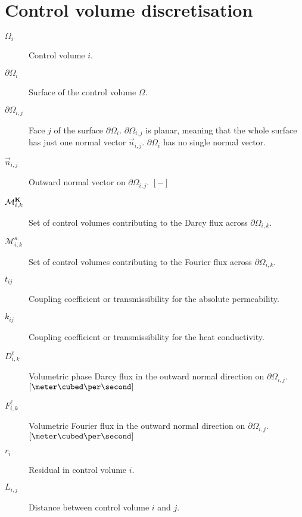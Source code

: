 
\section{Control volume discretisation}

\begin{description}
\item[$\Omega_i$] Control volume $i$.
\item[$\partial\Omega_i$] Surface of the control volume $\Omega$.
\item[$\partial\Omega_{i,j}$] Face $j$ of the surface
  $\partial\Omega_i$. $\partial\Omega_{i,j}$ is planar, meaning that
  the whole surface has just one normal vector $\vec n_{i,j}$.
  $\partial\Omega_i$ has no single normal vector.
\item[$\vec n_{i,j}$] Outward normal vector on $\partial\Omega_{i,j}$.
  $\left[-\right]$
\item[$\mathcal{M}_{i,k}^{\textbf K}$] Set of control volumes
  contributing to the Darcy flux across $\partial\Omega_{i,k}$.
\item[$\mathcal{M}_{i,k}^\kappa$] Set of control volumes contributing
  to the Fourier flux across $\partial\Omega_{i,k}$.
\item[$t_{ij}$] Coupling coefficient or transmissibility for the
  absolute permeability.
\item[$k_{ij}$] Coupling coefficient or transmissibility for the
  heat conductivity.
\item[$D_{i,k}^\ell$] Volumetric phase Darcy flux in the outward
  normal direction on $\partial\Omega_{i,j}$.
  $\left[\meter\cubed\per\second\right]$
\item[$F_{i,k}^\ell$] Volumetric Fourier flux in the outward normal
  direction on $\partial\Omega_{i,j}$.
  $\left[\meter\cubed\per\second\right]$
\item[$r_i$] Residual in control volume $i$.
\item[$L_{i,j}$] Distance between control volume $i$ and $j$.
\end{description}

